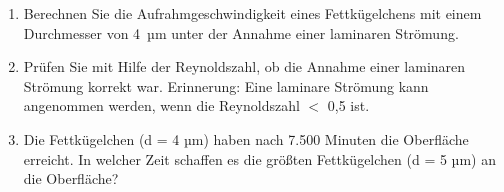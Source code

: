 \documentclass[a4paper,11pt]{article}
\newif\ifshowme
\begin{document}
\begin{enumerate}[label=\alph*)]

\item Berechnen Sie die Aufrahmgeschwindigkeit eines Fettkügelchens mit einem
Durchmesser von \mbox{4 µm} unter der Annahme einer laminaren Strömung.

\ifshowme
\antwort{
\begin{align*}
v &= \frac{d^2 \cdot g \cdot (\rho_1 - \rho_2)}{18 \cdot \eta} \\
v &= \frac{(4 \cdot 10^{-6} ~\text{m})^2 \cdot 9,81 ~\text{m/s}^2 \cdot 99,8 ~\text{kg/m}^3}{18 \cdot 1,79 \cdot 10^{-3} ~\text{Pa s}} \\
v &= 4,86 \cdot 10^{-7} ~\text{m/s}
\end{align*}
}
\else
\fi




\item Prüfen Sie mit Hilfe der Reynoldszahl, ob die Annahme einer laminaren Strömung
korrekt war. Erinnerung: Eine laminare Strömung kann angenommen werden, wenn
die Reynoldszahl $<$ 0,5 ist.
\ifshowme
\antwort{
\begin{align*}
Re &= \frac{\rho \cdot d \cdot v}{\eta} \\
Re &= \frac{1028 ~\text{kg/m}^3 \cdot 4 \cdot 10^{-6} ~\text{m} \cdot 4,86 \cdot 10^{-7} ~\text{m/s}}{1,79 \cdot 10^{-3} ~\text{Pa s}} \\
Re &= 1,116 \cdot 10^{-6}
\end{align*}
\RA Die Annahme einer laminaren Strömung war korrekt

}
\pagebreak
\else
\fi


\item Die Fettkügelchen (d = 4 µm) haben nach 7.500 Minuten die Oberfläche erreicht. In
welcher Zeit schaffen es die größten Fettkügelchen (d = 5 µm) an die Oberfläche?

\ifshowme
\antwort{

Strecke berechnen:
\begin{align*}
s = v \cdot t \rightarrow s &= 4,86 \cdot 10^{-7} ~\text{m/s} \cdot 7500 \cdot 60s \\
 &= 0,2187 ~\text{m} \\
\end{align*}
Geschwindigkeit größerer Fettkügelchen berechnen: 
\begin{align*}
v &= \frac{d^2 \cdot g \cdot (\rho_1 - \rho_2)}{18 \cdot \eta} \\
v &= \frac{(5 \cdot 10^{-6} ~\text{m})^2 \cdot 9,81 ~\text{m/s}^2 \cdot 99,8 ~\text{kg/m}^3}{18 \cdot 1,79 \cdot 10^{-3} ~\text{Pa s}} \\
v &= 7,59 \cdot 10^{-7} ~\text{m/s}
\end{align*}
Zeit die größere Fettkügelchen für Strecke $s$ benötigen:
\begin{align*}
t = \frac{s}{v} \rightarrow t &= \frac{0,2187 ~\text{m}}{7,59 \cdot 10^{-7} ~\text{m/s} \cdot 60} \\
&= 4802,4 ~\text{min}
\end{align*}
}
\else
\fi


\end{enumerate}
\end{document}

